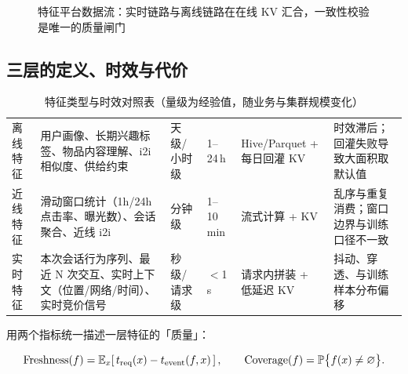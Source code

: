 \begin{figure}[htbp]
\caption{特征平台数据流：实时链路与离线链路在在线 KV 汇合，一致性校验是唯一的质量闸门}
\label{fig:feature-platform}
\end{figure}

\subsection{三层的定义、时效与代价}

\begin{table}[htbp]
\centering
\caption{特征类型与时效对照表（量级为经验值，随业务与集群规模变化）}
\label{tab:feature-freshness}
\small
\begin{tabularx}{\textwidth}{L{1.75cm} L{2.5cm} L{1.5cm} R{1.35cm} L{2.2cm} Y}
\toprule
{} &  &  &  &  &  \\
\midrule
离线特征 & 用户画像、长期兴趣标签、物品内容理解、i2i 相似度、供给约束 & 天级/小时级 & 1--24\,h & Hive/Parquet + 每日回灌 KV & 时效滞后；回灌失败导致大面积取默认值 \\
\addlinespace
近线特征 & 滑动窗口统计（1h/24h 点击率、曝光数）、会话聚合、近线 i2i & 分钟级 & 1--10\,min & 流式计算 + KV & 乱序与重复消费；窗口边界与训练口径不一致 \\
\addlinespace
实时特征 & 本次会话行为序列、最近 N 次交互、实时上下文（位置/网络/时间）、实时竞价信号 & 秒级/请求级 & $<$1\,s & 请求内拼装 + 低延迟 KV & 抖动、穿透、与训练样本分布偏移 \\
\bottomrule
\end{tabularx}
\end{table}

用两个指标统一描述一层特征的「质量」：

\begin{equation}
\text{Freshness}(f) = \operatorname{\mathbb{E}}_{x}\!\left[\, t_{\text{req}}(x) - t_{\text{event}}(f, x) \,\right],
\qquad
\text{Coverage}(f) = \operatorname{\mathbb{P}}\bigl\{ f(x) \neq \varnothing \bigr\} .
\label{eq:feature-freshness}
\end{equation}

